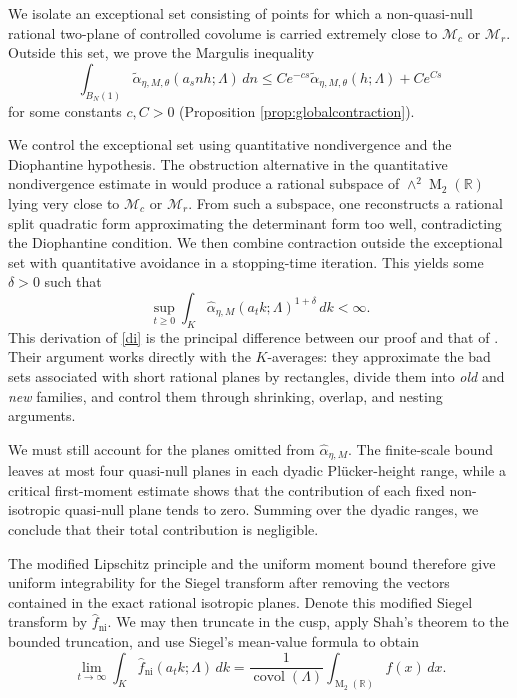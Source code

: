 \documentclass[reqno,11pt]{amsart}
\theoremstyle{definition}
\theoremstyle{remark}
\numberwithin{equation}{section}
\newcommand{\M}{\operatorname{M}}
\newcommand{\covol}{\operatorname{covol}}
\begin{document}
We isolate an exceptional set consisting of points for which a
non-quasi-null rational two-plane of controlled covolume is carried
extremely close to $\mathcal M_c$ or $\mathcal M_r$. Outside this set, we
prove the Margulis inequality
$$
\int_{B_N(1)}
\widetilde\alpha_{\eta,M,\theta}(a_snh;\Lambda)\,dn
\le
Ce^{-cs}\widetilde\alpha_{\eta,M,\theta}(h;\Lambda)
+
Ce^{Cs}
$$
for some constants $c,C>0$ (Proposition \ref{prop:globalcontraction}).

We control the exceptional set using quantitative nondivergence and the
Diophantine hypothesis. The obstruction alternative in the quantitative
nondivergence estimate in \cite{kleinbock:2008} would produce a rational subspace of
$\wedge^2\M_2(\mathbb R)$ lying very close to $\mathcal M_c$ or
$\mathcal M_r$. From such a subspace, one reconstructs a rational split
quadratic form approximating the determinant form too well, contradicting
the Diophantine condition. 
We then combine
contraction outside the exceptional set with quantitative avoidance in a
stopping-time iteration. This yields some $\delta>0$ such that
\begin{equation}\label{di}
\sup_{t\ge0}
\int_K
\widehat\alpha_{\eta,M}(a_tk;\Lambda)^{1+\delta}\,dk
<\infty.
\end{equation}
This derivation of \eqref{di} is the principal difference between our
proof and that of \cite{eskin-margulis-mozes:2005}. Their argument works
directly with the $K$-averages: they approximate the bad sets associated
with short rational planes by rectangles, divide them into
\emph{old} and \emph{new} families, and control them through shrinking,
overlap, and nesting arguments.


We must still account for the planes omitted from
$\widehat\alpha_{\eta,M}$. The finite-scale bound leaves at most four
quasi-null planes in each dyadic Pl\"ucker-height range, while a critical
first-moment estimate shows that the contribution of each fixed
non-isotropic quasi-null plane tends to zero. Summing over the dyadic
ranges, we conclude that their total contribution is negligible.

The modified Lipschitz principle and the uniform moment bound therefore give uniform integrability for the Siegel transform after removing the vectors contained in the exact rational isotropic planes. Denote this modified Siegel transform by $\widehat f_{\operatorname{ni}}$. We may then truncate in the cusp, apply Shah's theorem to the bounded truncation, and use Siegel's mean-value formula \cite{siegel1945mean} to obtain
$$
\lim_{t\to\infty}
\int_K\widehat f_{\operatorname{ni}}(a_tk;\Lambda)\,dk
=
\frac{1}{\covol(\Lambda)}
\int_{\M_2(\mathbb R)}f(x)\,dx.
$$
\end{document}
